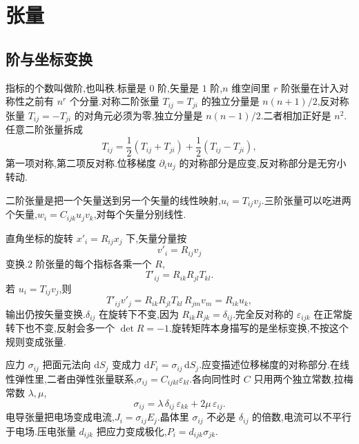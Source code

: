 \section{张量}

\subsection{阶与坐标变换}
指标的个数叫做阶,也叫秩.标量是 $0$ 阶,矢量是 $1$ 阶,$n$ 维空间里 $r$ 阶张量在计入对称性之前有 $n^r$ 个分量.对称二阶张量 $T_{ij}=T_{ji}$ 的独立分量是 $n(n+1)/2$,反对称张量 $T_{ij}=-T_{ji}$ 的对角元必须为零,独立分量是 $n(n-1)/2$.二者相加正好是 $n^2$.任意二阶张量拆成
\begin{equation}
  T_{ij}
  =\frac12(T_{ij}+T_{ji})
  +\frac12(T_{ij}-T_{ji}),
\end{equation}
第一项对称,第二项反对称.位移梯度 $\partial_i u_j$ 的对称部分是应变,反对称部分是无穷小转动.

二阶张量是把一个矢量送到另一个矢量的线性映射,$u_i=T_{ij}v_j$.三阶张量可以吃进两个矢量,$w_i=C_{ijk}u_j v_k$,对每个矢量分别线性.

直角坐标的旋转 $x'_i=R_{ij}x_j$ 下,矢量分量按
\begin{equation}
  v'_i=R_{ij}v_j
\end{equation}
变换.$2$ 阶张量的每个指标各乘一个 $R$,
\begin{equation}
  T'_{ij}=R_{ik}R_{jl}T_{kl}.
\end{equation}
若 $u_i=T_{ij}v_j$,则
\begin{equation}
  T'_{ij}v'_j
  =R_{ik}R_{jl}T_{kl}\,R_{jm}v_m
  =R_{ik}u_k,
\end{equation}
输出仍按矢量变换.$\delta_{ij}$ 在旋转下不变,因为 $R_{ik}R_{jk}=\delta_{ij}$.完全反对称的 $\varepsilon_{ijk}$ 在正常旋转下也不变,反射会多一个 $\det R=-1$.旋转矩阵本身描写的是坐标变换,不按这个规则变成张量.

应力 $\sigma_{ij}$ 把面元法向 $\mathrm{d}S_j$ 变成力 $\mathrm{d}F_i=\sigma_{ij}\,\mathrm{d}S_j$.应变描述位移梯度的对称部分.在线性弹性里,二者由弹性张量联系,$\sigma_{ij}=C_{ijkl}\varepsilon_{kl}$.各向同性时 $C$ 只用两个独立常数,拉梅常数 $\lambda,\mu$,
\begin{equation}
  \sigma_{ij}=\lambda\,\delta_{ij}\,\varepsilon_{kk}+2\mu\,\varepsilon_{ij}.
\end{equation}
电导张量把电场变成电流,$J_i=\sigma_{ij}E_j$.晶体里 $\sigma_{ij}$ 不必是 $\delta_{ij}$ 的倍数,电流可以不平行于电场.压电张量 $d_{ijk}$ 把应力变成极化,$P_i=d_{ijk}\sigma_{jk}$.

